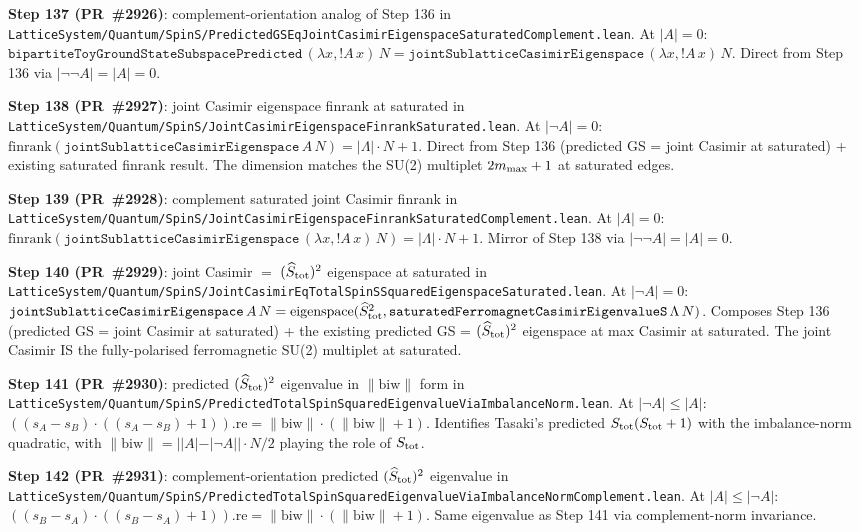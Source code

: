 \documentclass[a4paper,11pt]{article}
\begin{document}
\textbf{Step 137 (PR~\#2926)}: complement-orientation analog of
Step 136 in
\texttt{LatticeSystem/Quantum/SpinS/PredictedGSEqJointCasimirEigenspaceSaturatedComplement.lean}.
At $|A| = 0$:
$\mathtt{bipartiteToyGroundStateSubspacePredicted}\,(\lambda x, !A\,x)\,N =
\mathtt{jointSublatticeCasimirEigenspace}\,(\lambda x, !A\,x)\,N$.
Direct from Step 136 via $|\neg\neg A| = |A| = 0$.

\textbf{Step 138 (PR~\#2927)}: joint Casimir eigenspace finrank at
saturated in
\texttt{LatticeSystem/Quantum/SpinS/JointCasimirEigenspaceFinrankSaturated.lean}.
At $|\neg A| = 0$:
$\mathrm{finrank}(\mathtt{jointSublatticeCasimirEigenspace}\,A\,N) =
|\Lambda|\cdot N + 1$. Direct from Step 136 (predicted GS = joint
Casimir at saturated) + existing saturated finrank result. The
dimension matches the SU(2) multiplet $2m_{\rm max} + 1$ at
saturated edges.

\textbf{Step 139 (PR~\#2928)}: complement saturated joint Casimir
finrank in
\texttt{LatticeSystem/Quantum/SpinS/JointCasimirEigenspaceFinrankSaturatedComplement.lean}.
At $|A| = 0$:
$\mathrm{finrank}(\mathtt{jointSublatticeCasimirEigenspace}\,
   (\lambda x, !A\,x)\,N) = |\Lambda|\cdot N + 1$.
Mirror of Step 138 via $|\neg\neg A| = |A| = 0$.

\textbf{Step 140 (PR~\#2929)}: joint Casimir $=$ $(\widehat S_{\rm tot})^2$
eigenspace at saturated in
\texttt{LatticeSystem/Quantum/SpinS/JointCasimirEqTotalSpinSSquaredEigenspaceSaturated.lean}.
At $|\neg A| = 0$:
$\mathtt{jointSublatticeCasimirEigenspace}\,A\,N =
\mathrm{eigenspace}(\widehat S_{\rm tot}^2, \mathtt{saturatedFerromagnetCasimirEigenvalueS}\,\Lambda\,N)$.
Composes Step 136 (predicted GS = joint Casimir at saturated) +
the existing predicted GS = $(\widehat S_{\rm tot})^2$ eigenspace at
max Casimir at saturated. The joint Casimir IS the fully-polarised
ferromagnetic SU(2) multiplet at saturated.

\textbf{Step 141 (PR~\#2930)}: predicted $(\widehat S_{\rm tot})^2$
eigenvalue in $\|\mathrm{biw}\|$ form in
\texttt{LatticeSystem/Quantum/SpinS/PredictedTotalSpinSquaredEigenvalueViaImbalanceNorm.lean}.
At $|\neg A| \le |A|$:
$((s_A - s_B)\cdot((s_A - s_B) + 1)).\mathrm{re} =
\|\mathrm{biw}\|\cdot(\|\mathrm{biw}\| + 1)$.
Identifies Tasaki's predicted $S_{\rm tot}(S_{\rm tot}+1)$ with the
imbalance-norm quadratic, with $\|\mathrm{biw}\| = ||A|-|\neg A||\cdot N/2$
playing the role of $S_{\rm tot}$.

\textbf{Step 142 (PR~\#2931)}: complement-orientation predicted
$(\widehat S_{\rm tot})^2$ eigenvalue in
\texttt{LatticeSystem/Quantum/SpinS/PredictedTotalSpinSquaredEigenvalueViaImbalanceNormComplement.lean}.
At $|A| \le |\neg A|$:
$((s_B - s_A)\cdot((s_B - s_A) + 1)).\mathrm{re} =
\|\mathrm{biw}\|\cdot(\|\mathrm{biw}\| + 1)$.
Same eigenvalue as Step 141 via complement-norm invariance.
\end{document}
